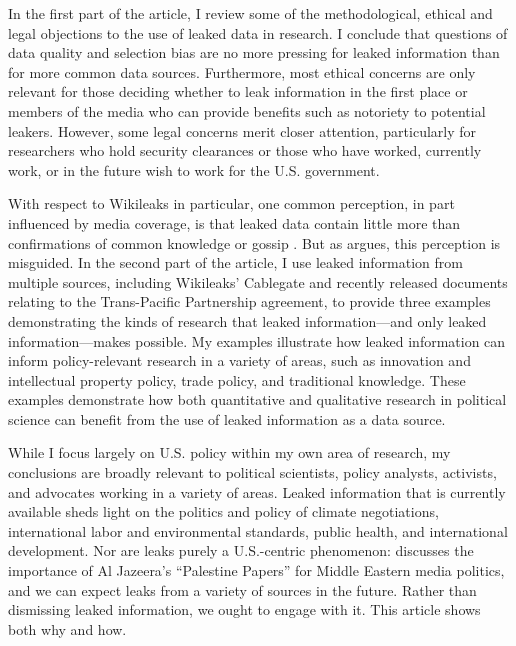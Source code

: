 \documentclass[12pt]{article}
\begin{document}
In the first part of the article, I review some of the methodological, ethical and legal objections to the use of leaked data 
in research. I conclude that 
questions of data quality and selection bias are no more pressing for leaked information 
than for more common data sources. Furthermore, most ethical concerns are only relevant for those deciding 
whether to leak information in the first place or members of the media who can provide benefits 
such as notoriety to potential leakers. However, some legal concerns merit closer attention, particularly for researchers 
who hold security clearances or those who have worked, currently work, or in the future wish to work for the U.S. government.

With respect to Wikileaks in particular, one common perception, in part influenced by media 
coverage, is that leaked data contain little more than confirmations of common knowledge or 
gossip \citep{saunders2011wikileaks,chesterman2011wikileaks}. But as \citet{bob2010wikileaks} argues, this perception is 
misguided. In the second part of the article, I use leaked information from multiple sources, including Wikileaks' 
Cablegate and recently 
released documents relating to the Trans-Pacific Partnership agreement, to provide three examples 
demonstrating the kinds of research that leaked information---and only leaked information---makes possible. 
My examples illustrate how leaked information can inform policy-relevant research in a variety of areas, such as 
innovation and intellectual property policy, trade policy, and traditional knowledge.
These examples demonstrate 
how both quantitative and qualitative research in political science can benefit from the use of 
leaked information as a data source. 

While I focus largely on U.S. policy within my own area of research, my conclusions are broadly relevant 
to political scientists, policy analysts, activists, and advocates working in a variety of areas. 
Leaked information that is currently available sheds light on the politics and policy of climate negotiations, 
international labor and environmental standards, public health, and international development. Nor are leaks 
purely a U.S.-centric phenomenon: \citet{zayani2013jazeeras} discusses the importance of Al Jazeera's 
``Palestine Papers'' for Middle Eastern media politics, and we can expect leaks from a variety of sources in the future. 
Rather than dismissing leaked information, we ought to engage with it. This article shows both why and how.
\end{document}
